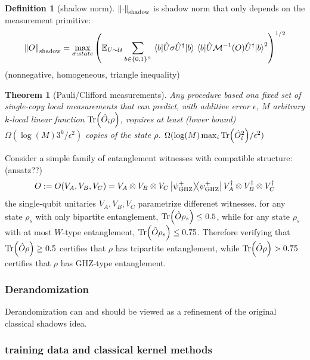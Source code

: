 \documentclass[
10pt,
aps,
pra,
linenumbers,
floatfix,
]{revtex4-2}
\theoremstyle{plain}
\newtheorem{theorem}{Theorem}
\theoremstyle{definition}
\newtheorem{definition}{Definition}
\newcommand{\ghz}{\text{GHZ}}
\newcommand{\shadow}{\textup{shadow}}
\newcommand{\ob}{\hat{O}}
\newcommand{\U}{\hat{U}}
\newcommand{\dm}{\rho}
\begin{document}
\begin{definition}[shadow norm]\label{def:shadow_norm}
	$\norm{\cdot}_{\shadow}$ is shadow norm that only depends on the measurement primitive:
	\begin{equation}
		\norm{O}_{\shadow} =\max_{\sigma:state} \qty(
			\expectation_{U\sim \mathcal{U}}
			\sum_{b\in \qty{0,1}^n } \mel{b}{\U\sigma\U^\dagger}{b} 
			\mel{b}{\U\mathcal{M}^{-1}(O) \U^\dagger}{b}^2 
		)^{1/2}
	\end{equation}
	(nonnegative, homogeneous, triangle inequality)
\end{definition}

\begin{theorem}[Pauli/Clifford measurements]\label{thm:classical_shadow_lower}
	Any procedure based ona fixed set of single-copy local measurements that can predict,
	with additive error $\epsilon$, $M$ arbitrary $k$-local linear function $\Tr(\ob_i\dm)$,
	requires at least (lower bound)
	$\Omega(\log(M) 3^k/\epsilon^2)$ copies of the state $\dm$.
	$\Omega(\log(M) \max_i\Tr(\ob_i^2)/\epsilon^2)$ 
\end{theorem}
Consider a simple family of entanglement witnesses with compatible structure:  (ansatz??)
\begin{equation}
	O:= O(V_A,V_B,V_C)=V_A\otimes V_B \otimes V_C \op{\psi_{\ghz}^+} V_A^\dagger\otimes V_B^\dagger \otimes V_C^\dagger
\end{equation}
the single-qubit unitaries $V_A,V_B,V_C$ parametrize differenet witnesses.
for any state $\dm_s$ with only bipartite entanglement, $\Tr(\ob \dm_s)\le 0.5$, 
while for any state $\dm_s$ with at most $W$-type entanglement, $\Tr(\ob \dm_s)\le 0.75$.
Therefore verifying that $\Tr(\ob \dm)\ge 0.5$ certifies that $\dm$ has tripartite entanglement, while $\Tr(\ob \dm)> 0.75$ certifies that $\dm$ has $\ghz$-type entanglement.

\subsubsection{Derandomization}
Derandomization can and should be viewed as a refinement of the original classical shadows idea. \cite{huangEfficientEstimationPauli2021} \cite{elbenMixedstateEntanglementLocal2020}

\subsubsection{training data and classical kernel methods}
\end{document}
